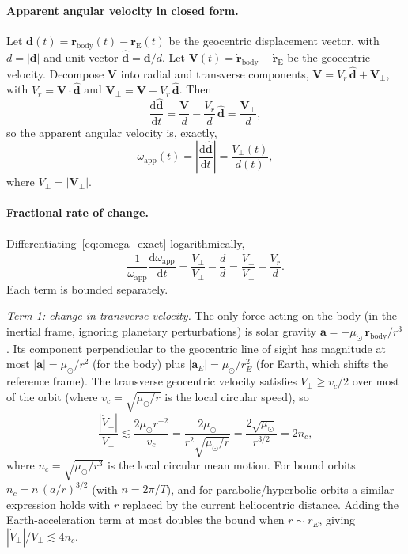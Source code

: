 \documentclass[11pt,a4paper]{article}
\begin{document}
\paragraph{Apparent angular velocity in closed form.}
Let $\mathbf{d}(t) = \mathbf{r}_\mathrm{body}(t) - \mathbf{r}_\mathrm{E}(t)$
be the geocentric displacement vector, with
$d = |\mathbf{d}|$ and unit vector $\hat{\mathbf{d}} = \mathbf{d}/d$.
Let $\mathbf{V}(t) = \dot{\mathbf{r}}_\mathrm{body} - \dot{\mathbf{r}}_\mathrm{E}$
be the geocentric velocity.
Decompose $\mathbf{V}$ into radial and transverse components,
$\mathbf{V} = V_r\,\hat{\mathbf{d}} + \mathbf{V}_\perp$,
with $V_r = \mathbf{V}\cdot\hat{\mathbf{d}}$ and
$\mathbf{V}_\perp = \mathbf{V} - V_r\,\hat{\mathbf{d}}$. Then
\begin{equation}
  \frac{\mathrm{d}\hat{\mathbf{d}}}{\mathrm{d}t}
  = \frac{\mathbf{V}}{d} - \frac{V_r}{d}\,\hat{\mathbf{d}}
  = \frac{\mathbf{V}_\perp}{d},
\end{equation}
so the apparent angular velocity is, exactly,
\begin{equation}
  \label{eq:omega_exact}
  \omega_\mathrm{app}(t) = \left|\frac{\mathrm{d}\hat{\mathbf{d}}}{\mathrm{d}t}\right|
  = \frac{V_\perp(t)}{d(t)},
\end{equation}
where $V_\perp = |\mathbf{V}_\perp|$.

\paragraph{Fractional rate of change.}
Differentiating~\eqref{eq:omega_exact} logarithmically,
\begin{equation}
  \label{eq:domega_frac}
  \frac{1}{\omega_\mathrm{app}}\frac{\mathrm{d}\omega_\mathrm{app}}{\mathrm{d}t}
  = \frac{\dot{V}_\perp}{V_\perp} - \frac{\dot{d}}{d}
  = \frac{\dot{V}_\perp}{V_\perp} - \frac{V_r}{d}.
\end{equation}
Each term is bounded separately.

\textit{Term 1: change in transverse velocity.}
The only force acting on the body (in the inertial frame, ignoring planetary
perturbations) is solar gravity $\mathbf{a} = -\mu_\odot\,\mathbf{r}_\mathrm{body}/r^3$.
Its component perpendicular to the geocentric line of sight has magnitude at most
$|\mathbf{a}| = \mu_\odot/r^2$ (for the body) plus $|\mathbf{a}_E| = \mu_\odot/r_E^2$
(for Earth, which shifts the reference frame).
The transverse geocentric velocity satisfies $V_\perp \ge v_c/2$ over most of the
orbit (where $v_c = \sqrt{\mu_\odot/r}$ is the local circular speed), so
\begin{equation}
  \frac{|\dot{V}_\perp|}{V_\perp}
  \lesssim \frac{2\mu_\odot r^{-2}}{v_c}
  = \frac{2\mu_\odot}{r^2\sqrt{\mu_\odot/r}}
  = \frac{2\sqrt{\mu_\odot}}{r^{3/2}}
  = 2n_c,
\end{equation}
where $n_c = \sqrt{\mu_\odot/r^3}$ is the local circular mean motion.
For bound orbits $n_c = n\,(a/r)^{3/2}$ (with $n=2\pi/T$), and for
parabolic/hyperbolic orbits a similar expression holds with $r$ replaced by
the current heliocentric distance. Adding the Earth-acceleration term at most
doubles the bound when $r \sim r_E$, giving $|\dot{V}_\perp|/V_\perp \lesssim 4n_c$.
\end{document}
